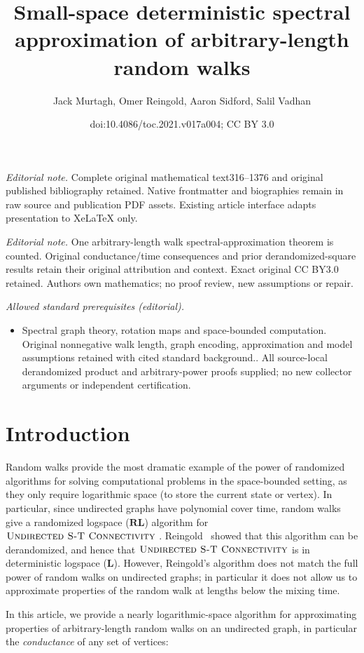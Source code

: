 \documentclass[11pt]{article}
\title{Small-space deterministic spectral approximation of arbitrary-length random walks}
\author{Jack Murtagh, Omer Reingold, Aaron Sidford, Salil Vadhan}
\date{doi:10.4086/toc.2021.v017a004; CC BY 3.0}
\numberwithin{equation}{section}
\theoremstyle{definition}
\theoremstyle{plain}
\newcommand{\class}[1]{\mathbf{#1}}
\newcommand{\RL}{\class{RL}}
\renewcommand{\L}{\class{L}}
\def\textprob#1{\textmd{\textsc{#1}}}
\newcommand{\USTConn}{\textprob{Undirected S-T Connectivity}}
\numberwithin{myalgctr}{section}
\theoremstyle{named}
\begin{document}
\maketitle
\noindent\textit{Editorial note.} Complete original mathematical text316--1376 and original published bibliography retained. Native frontmatter and biographies remain in raw source and publication PDF assets. Existing article interface adapts presentation to XeLaTeX only.\par\medskip
\noindent\textit{Editorial note.} One arbitrary-length walk spectral-approximation theorem is counted. Original conductance/time consequences and prior derandomized-square results retain their original attribution and context. Exact original CC BY3.0 retained. Authors own mathematics; no proof review, new assumptions or repair.\par\medskip
\noindent\textit{Allowed standard prerequisites (editorial).}\begin{itemize}
\item Spectral graph theory, rotation maps and space-bounded computation. Original nonnegative walk length, graph encoding, approximation and model assumptions retained with cited standard background.. All source-local derandomized product and arbitrary-power proofs supplied; no new collector arguments or independent certification.
\end{itemize}\medskip
\section{Introduction}
\label{sect:intro}
Random walks provide the most dramatic example of the power of randomized algorithms for solving computational problems in the space-bounded setting, as they only require logarithmic space (to store the current state or vertex). In particular, since undirected graphs have polynomial cover time, random walks give a randomized logspace ($\RL$) algorithm for $\USTConn$ \cite{AleliunasKaLiLoRa79}. Reingold~\cite{Reingold08} showed that this algorithm can be derandomized, and hence that $\USTConn$ is in deterministic logspace ($\L$). However, Reingold's algorithm does not match the full power of random walks on undirected graphs; in particular it does not allow us to approximate properties of the random walk at lengths below the mixing time. 

In this %
article,  %
we provide a nearly logarithmic-space algorithm for approximating properties of arbitrary-length random walks on an undirected graph, in particular the \emph{conductance} of any set of vertices:
\end{document}
